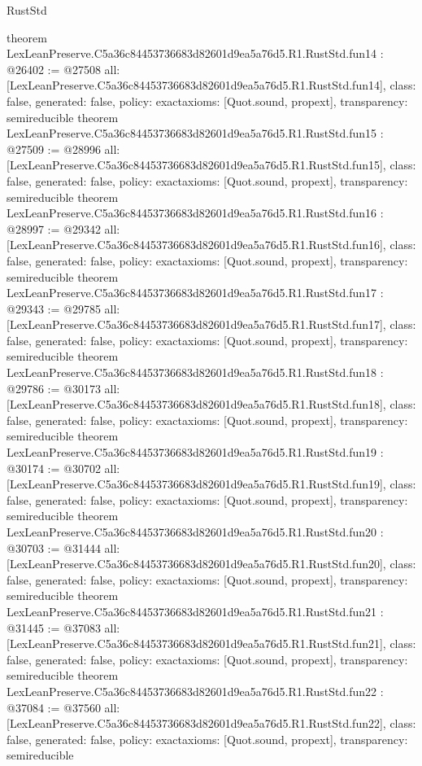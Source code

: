 \begin{lexlean}{RustStd}
\begin{coremodule}
{}
theorem LexLeanPreserve.C5a36c84453736683d82601d9ea5a76d5.R1.RustStd.fun14 : @26402 := @27508 {
  all: [LexLeanPreserve.C5a36c84453736683d82601d9ea5a76d5.R1.RustStd.fun14],
  class: false,
  generated: false,
  policy: exact{axioms: [Quot.sound, propext]},
  transparency: semireducible
}
theorem LexLeanPreserve.C5a36c84453736683d82601d9ea5a76d5.R1.RustStd.fun15 : @27509 := @28996 {
  all: [LexLeanPreserve.C5a36c84453736683d82601d9ea5a76d5.R1.RustStd.fun15],
  class: false,
  generated: false,
  policy: exact{axioms: [Quot.sound, propext]},
  transparency: semireducible
}
theorem LexLeanPreserve.C5a36c84453736683d82601d9ea5a76d5.R1.RustStd.fun16 : @28997 := @29342 {
  all: [LexLeanPreserve.C5a36c84453736683d82601d9ea5a76d5.R1.RustStd.fun16],
  class: false,
  generated: false,
  policy: exact{axioms: [Quot.sound, propext]},
  transparency: semireducible
}
theorem LexLeanPreserve.C5a36c84453736683d82601d9ea5a76d5.R1.RustStd.fun17 : @29343 := @29785 {
  all: [LexLeanPreserve.C5a36c84453736683d82601d9ea5a76d5.R1.RustStd.fun17],
  class: false,
  generated: false,
  policy: exact{axioms: [Quot.sound, propext]},
  transparency: semireducible
}
theorem LexLeanPreserve.C5a36c84453736683d82601d9ea5a76d5.R1.RustStd.fun18 : @29786 := @30173 {
  all: [LexLeanPreserve.C5a36c84453736683d82601d9ea5a76d5.R1.RustStd.fun18],
  class: false,
  generated: false,
  policy: exact{axioms: [Quot.sound, propext]},
  transparency: semireducible
}
theorem LexLeanPreserve.C5a36c84453736683d82601d9ea5a76d5.R1.RustStd.fun19 : @30174 := @30702 {
  all: [LexLeanPreserve.C5a36c84453736683d82601d9ea5a76d5.R1.RustStd.fun19],
  class: false,
  generated: false,
  policy: exact{axioms: [Quot.sound, propext]},
  transparency: semireducible
}
theorem LexLeanPreserve.C5a36c84453736683d82601d9ea5a76d5.R1.RustStd.fun20 : @30703 := @31444 {
  all: [LexLeanPreserve.C5a36c84453736683d82601d9ea5a76d5.R1.RustStd.fun20],
  class: false,
  generated: false,
  policy: exact{axioms: [Quot.sound, propext]},
  transparency: semireducible
}
theorem LexLeanPreserve.C5a36c84453736683d82601d9ea5a76d5.R1.RustStd.fun21 : @31445 := @37083 {
  all: [LexLeanPreserve.C5a36c84453736683d82601d9ea5a76d5.R1.RustStd.fun21],
  class: false,
  generated: false,
  policy: exact{axioms: [Quot.sound, propext]},
  transparency: semireducible
}
theorem LexLeanPreserve.C5a36c84453736683d82601d9ea5a76d5.R1.RustStd.fun22 : @37084 := @37560 {
  all: [LexLeanPreserve.C5a36c84453736683d82601d9ea5a76d5.R1.RustStd.fun22],
  class: false,
  generated: false,
  policy: exact{axioms: [Quot.sound, propext]},
  transparency: semireducible
}
\end{coremodule}
\end{lexlean}
